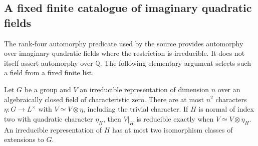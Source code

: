 \subsection{A fixed finite catalogue of imaginary quadratic fields}
\label{sec:sr-finite-CM-catalogue}
The rank-four automorphy predicate used by the source provides
automorphy over imaginary quadratic fields where the restriction
is irreducible. It does not itself assert automorphy over
\(\mathbb Q\). The following elementary argument selects such a
field from a fixed finite list.

\begin{srlemma}\label{lem:sr-quadratic-self-twists}
Let \(G\) be a group and \(V\) an irreducible representation of
dimension \(n\) over an algebraically closed field of
characteristic zero.
There are at most \(n^2\) characters \(\eta:G\to L^\times\)
with \(V\simeq V\otimes\eta\), including the trivial character.
If \(H\) is normal of index two with quadratic character
\(\eta_H\), then \(V|_H\) is reducible exactly when
\(V\simeq V\otimes\eta_H\).
An irreducible representation of \(H\) has at most two isomorphism
classes of extensions to \(G\).
\end{srlemma}
